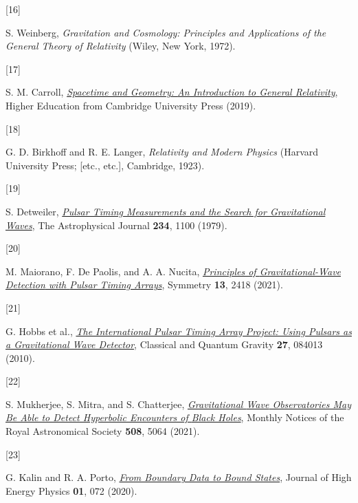 \documentclass[
  11pt,
  a4paper,
  DIV=11,
  numbers=noendperiod,
  twoside]{scrreprt}
\newlength{\cslhangindent}
\newlength{\csllabelwidth}
\newlength{\cslentryspacingunit} %
\newenvironment{CSLReferences}[2] %
 {%
  \setlength{\parindent}{0pt}
  \ifodd #1
  \let\oldpar\par
  \def\par{\hangindent=\cslhangindent\oldpar}
  \fi
  \setlength{\parskip}{#2\cslentryspacingunit}
 }%
 {}
\newcommand{\CSLLeftMargin}[1]{\parbox[t]{\csllabelwidth}{#1}}
\newcommand{\CSLRightInline}[1]{\parbox[t]{\linewidth - \csllabelwidth}{#1}\break}
\DeclareRobustCommand{\[}{\begin{equation}}
\DeclareRobustCommand{\]}{\end{equation}}
\begin{document}
\begin{CSLReferences}{0}{0}
\leavevmode{}%
\CSLLeftMargin{{[}16{]} }%
\CSLRightInline{S. Weinberg, \emph{Gravitation and Cosmology: Principles
and Applications of the General Theory of Relativity} ({Wiley}, {New
York}, 1972).}

\leavevmode{}%
\CSLLeftMargin{{[}17{]} }%
\CSLRightInline{S. M. Carroll,
\emph{\href{https://doi.org/10.1017/9781108770385}{Spacetime and
{Geometry}: {An Introduction} to {General Relativity}}}, Higher
Education from Cambridge University Press (2019).}

\leavevmode{}%
\CSLLeftMargin{{[}18{]} }%
\CSLRightInline{G. D. Birkhoff and R. E. Langer, \emph{Relativity and
Modern Physics} ({Harvard University Press; {[}etc., etc.{]}},
{Cambridge}, 1923).}

\leavevmode{}%
\CSLLeftMargin{{[}19{]} }%
\CSLRightInline{S. Detweiler,
\emph{\href{https://doi.org/10.1086/157593}{Pulsar Timing Measurements
and the Search for Gravitational Waves}}, The Astrophysical Journal
\textbf{234}, 1100 (1979).}

\leavevmode{}%
\CSLLeftMargin{{[}20{]} }%
\CSLRightInline{M. Maiorano, F. De Paolis, and A. A. Nucita,
\emph{\href{https://doi.org/10.3390/sym13122418}{Principles of
{Gravitational-Wave Detection} with {Pulsar Timing Arrays}}}, Symmetry
\textbf{13}, 2418 (2021).}

\leavevmode{}%
\CSLLeftMargin{{[}21{]} }%
\CSLRightInline{G. Hobbs et al.,
\emph{\href{https://doi.org/10.1088/0264-9381/27/8/084013}{The
International Pulsar Timing Array Project: Using Pulsars as a
Gravitational Wave Detector}}, Classical and Quantum Gravity
\textbf{27}, 084013 (2010).}

\leavevmode{}%
\CSLLeftMargin{{[}22{]} }%
\CSLRightInline{S. Mukherjee, S. Mitra, and S. Chatterjee,
\emph{\href{https://doi.org/10.1093/mnras/stab2721}{Gravitational {Wave}
Observatories May Be Able to Detect Hyperbolic Encounters of {Black
Holes}}}, Monthly Notices of the Royal Astronomical Society
\textbf{508}, 5064 (2021).}

\leavevmode{}%
\CSLLeftMargin{{[}23{]} }%
\CSLRightInline{G. Kalin and R. A. Porto,
\emph{\href{https://doi.org/10.1007/JHEP01(2020)072}{From Boundary Data
to Bound States}}, Journal of High Energy Physics \textbf{01}, 072
(2020).}


\end{CSLReferences}
\end{document}
